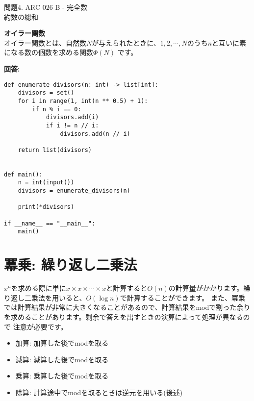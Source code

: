 \documentclass{jlreq}
\begin{document}
問題4. ARC 026 B - 完全数\\
約数の総和
\begin{tcolorbox}[enhanced,
    colback=white!85!gray,
    drop fuzzy shadow,
    boxrule=0.3mm,
    arc=0mm,
    left=0pt,
    top=0pt,
    sharp corners,
    width=\textwidth,
    ]
    \textbf{オイラー関数} \\
    オイラー関数とは、自然数$N$が与えられたときに、$1, 2, \cdots, N$のうち$n$と互いに素になる数の個数を求める関数$\Phi(N)$
    です。
  \tcblower
  
  \begin{tcolorbox}[
    coltext=white!10!blue,
    colback=white!90!purple!90!blue,
    drop fuzzy shadow,
    boxrule=0mm,
    arc=0mm,
    width=1.3cm,
    left=0pt,
    right=0pt,
    top=0pt,
    bottom=0pt,
    halign=flush left,
  ]
  \end{tcolorbox}
  \tcblower
  \textbf{回答:}
  \begin{lstlisting}
def enumerate_divisors(n: int) -> list[int]:
    divisors = set()
    for i in range(1, int(n ** 0.5) + 1):
        if n % i == 0:
            divisors.add(i)
            if i != n // i:
                divisors.add(n // i)
    
    return list(divisors)


def main():
    n = int(input())
    divisors = enumerate_divisors(n)
    
    print(*divisors)
    
if __name__ == "__main__":
    main()

  \end{lstlisting}
  \end{tcolorbox}%

\section{冪乗: 繰り返し二乗法}

$x^n$を求める際に単に$x \times x \times \cdots \times x$と計算すると$O(n)$の計算量がかかります。繰り返し二乗法を用いると、$O(\log n)$で計算することができます。
また、冪乗では計算結果が非常に大きくなることがあるので、計算結果をmodで割った余りを求めることがあります。剰余で答えを出すときの演算によって処理が異なるので
注意が必要です。

\begin{itemize}
    \item 加算: 加算した後でmodを取る
    \item 減算: 減算した後でmodを取る
    \item 乗算: 乗算した後でmodを取る
    \item 除算: 計算途中でmodを取るときは逆元を用いる(後述)
\end{itemize}
\end{document}
